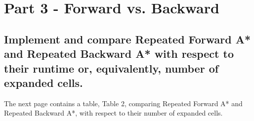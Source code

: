 \documentclass{article}
\begin{document}

\section{Part 3 - Forward vs. Backward}


\subsection{Implement and compare Repeated Forward A* and Repeated Backward A* with respect to their runtime or, equivalently, number of expanded cells. }
The next page contains a table, Table 2, comparing Repeated Forward A* and Repeated Backward A*, with respect to their number of expanded cells.\\
\end{document}
